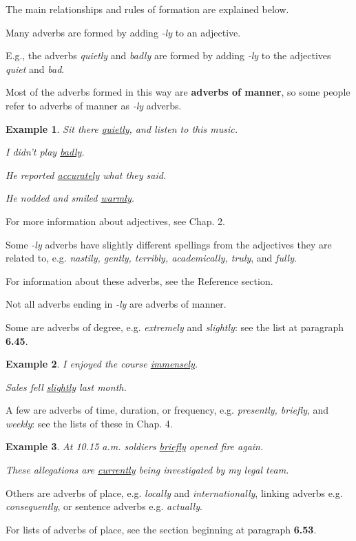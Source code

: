 \documentclass[oneside]{book}
\numberwithin{equation}{section}
\newtheorem{example}{Example}[section]
\begin{document}
The main relationships and rules of formation are explained below.

%
Many adverbs are formed by adding \textit{-ly} to an adjective.

E.g., the adverbs \textit{quietly} and \textit{badly} are formed by adding \textit{-ly} to the adjectives \textit{quiet} and \textit{bad}.

%
Most of the adverbs formed in this way are \textbf{adverbs of manner}, so some people refer to adverbs of manner as \textit{-ly} adverbs.
\begin{example}
    Sit there \underline{quietly}, and listen to this music.
    
    I didn't play \underline{badly}.
    
    He reported \underline{accurately} what they said.
    
    He nodded and smiled \underline{warmly}.
\end{example}
For more information about adjectives, see Chap. 2.

%
\noindent{} Some \textit{-ly} adverbs have slightly different spellings from the adjectives they are related to, e.g. \textit{nastily, gently, terribly, academically, truly}, and \textit{fully}.

For information about these adverbs, see the Reference section.

%
\noindent{} Not all adverbs ending in \textit{-ly} are adverbs of manner.

Some are adverbs of degree, e.g. \textit{extremely} and \textit{slightly}: see the list at paragraph \textbf{6.45}.
\begin{example}
    I enjoyed the course \underline{immensely}.
    
    Sales fell \underline{slightly} last month.
\end{example}
A few are adverbs of time, duration, or frequency, e.g. \textit{presently, briefly}, and \textit{weekly}: see the lists of these in Chap. 4.
\begin{example}
    At 10.15 a.m. soldiers \underline{briefly} opened fire again.
    
    These allegations are \underline{currently} being investigated by my legal team.
\end{example}
Others are adverbs of place, e.g. \textit{locally} and \textit{internationally}, linking adverbs e.g. \textit{consequently}, or sentence adverbs e.g. \textit{actually}.

For lists of adverbs of place, see the section beginning at paragraph \textbf{6.53}.
\end{document}
